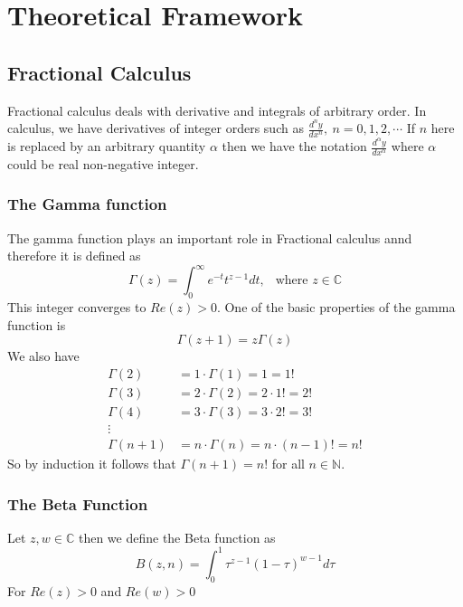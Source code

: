 \documentclass[a4 paper, 12pt]{report}
\theoremstyle{plain}
\begin{document}
\section{Theoretical Framework}

\subsection{Fractional Calculus}
\noindent
Fractional calculus deals with derivative and integrals of arbitrary order. In calculus, we have derivatives of integer orders such as $\frac{d^ny}{dx^n},~n = 0,1,2,\cdots$ If $n$ here is replaced by an arbitrary quantity $\alpha$ then we have the notation $\frac{d^\alpha y}{dx^\alpha}$ where $\alpha$ could be real non-negative integer.\\
\subsubsection{The Gamma function}
\noindent
\par The gamma function plays an important role in Fractional calculus annd therefore it is defined as
$$
\Gamma(z) = \int_0^\infty e^{-t}t^{z-1}dt, ~~\mbox{  where  } z\in\mathbb{C}
$$
This integer converges to $Re(z)>0$. One of the basic properties of the gamma function is
$$
\Gamma(z+1) = z\Gamma(z)
$$
We also have
\begin{align*}
\Gamma(2)& = 1\cdot \Gamma(1) = 1 = 1!\\
\Gamma(3)& = 2\cdot \Gamma(2) = 2\cdot 1! = 2!\\
\Gamma(4)& = 3\cdot \Gamma(3) = 3\cdot 2! = 3!\\
\vdots&\\
\Gamma(n+1)& = n\cdot \Gamma(n) = n\cdot (n-1)! = n!
\end{align*}
So by induction it follows that $\Gamma(n+1) = n!$ for all $n\in\mathbb{N}$.
\subsubsection{The Beta Function}
Let $z,w\in\mathbb{C}$ then we define the Beta function as
$$
B(z,n) = \int_0^1\tau^{z-1}(1-\tau)^{w-1}d\tau
$$
For $Re(z)>0$ and $Re(w)>0$
\end{document}
